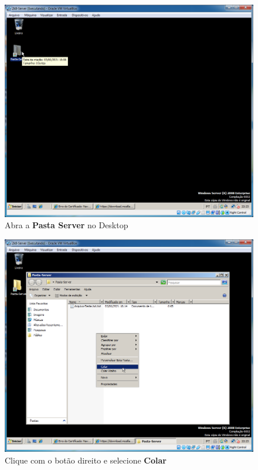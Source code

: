 \documentclass[10pt]{article}
\begin{document}
\begin{figure}[H]
    \centering
    \caption{Abra a \textbf{Pasta Server} no Desktop}
    \label{fig:re065}
    \includegraphics[width=\linewidth]{images/rede_externa/re065.png}
\end{figure}
\begin{figure}[H]
    \centering
    \caption{Clique com o botão direito e selecione \textbf{Colar}}
    \label{fig:re066}
    \includegraphics[width=\linewidth]{images/rede_externa/re066.png}
\end{figure}
\end{document}
